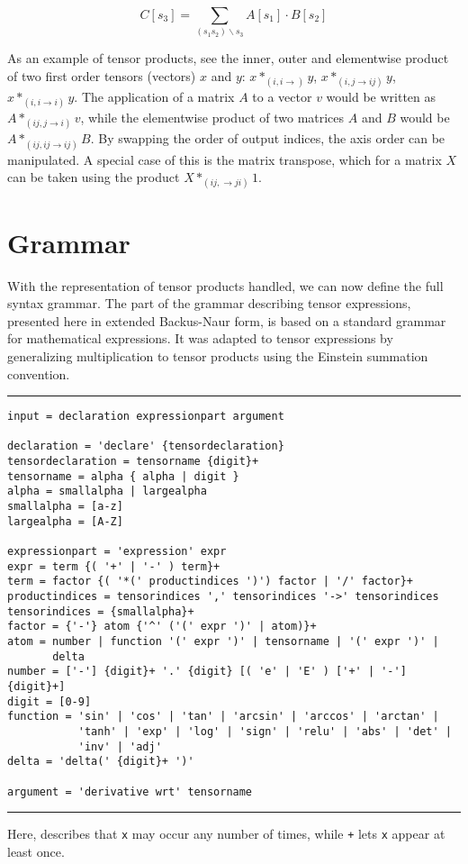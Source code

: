 \documentclass[12pt, a4paper]{report} %
\begin{document}
\begin{equation}
    C[s_3] = \sum_{(s_1 s_2)  \backslash s_3} A[s_1] \cdot B[s_2]
    \label{eq:product}
\end{equation}

As an example of tensor products, see the inner, outer and elementwise product of two first order tensors (vectors) $x$ and $y$: $x*_{(i,i \rightarrow)}y$, $x*_{(i,j \rightarrow ij)}y$, $x*_{(i,i \rightarrow i)}y$.
The application of a matrix $A$ to a vector $v$ would be written as $A*_{(ij,j \rightarrow i)}v$, while the elementwise product of two matrices $A$ and $B$ would be $A*_{(ij,ij \rightarrow ij)}B$.
By swapping the order of output indices, the axis order can be manipulated.
A special case of this is the matrix transpose, which for a matrix $X$ can be taken using the product $X *_{(ij, \rightarrow ji)} 1$.

\section{Grammar}
With the representation of tensor products handled, we can now define the full syntax grammar.
The part of the grammar describing tensor expressions, presented here in extended Backus-Naur form, is based on a standard grammar for mathematical expressions.
It was adapted to tensor expressions by generalizing multiplication to tensor products using the Einstein summation convention.

\rule[-2pt]{\textwidth}{0.5pt}
{
\small
\begin{verbatim}
input = declaration expressionpart argument

declaration = 'declare' {tensordeclaration}
tensordeclaration = tensorname {digit}+
tensorname = alpha { alpha | digit }
alpha = smallalpha | largealpha
smallalpha = [a-z]
largealpha = [A-Z]

expressionpart = 'expression' expr
expr = term {( '+' | '-' ) term}+
term = factor {( '*(' productindices ')') factor | '/' factor}+
productindices = tensorindices ',' tensorindices '->' tensorindices
tensorindices = {smallalpha}+
factor = {'-'} atom {'^' ('(' expr ')' | atom)}+
atom = number | function '(' expr ')' | tensorname | '(' expr ')' | 
       delta
number = ['-'] {digit}+ '.' {digit} [( 'e' | 'E' ) ['+' | '-'] {digit}+]
digit = [0-9]
function = 'sin' | 'cos' | 'tan' | 'arcsin' | 'arccos' | 'arctan' | 
           'tanh' | 'exp' | 'log' | 'sign' | 'relu' | 'abs' | 'det' | 
           'inv' | 'adj'
delta = 'delta(' {digit}+ ')' 

argument = 'derivative wrt' tensorname
\end{verbatim}
}
\rule[8pt]{\textwidth}{0.1pt}
Here, \texttt{} describes that \texttt{x} may occur any number of times, while \texttt{+} lets \texttt{x} appear at least once.
\end{document}
